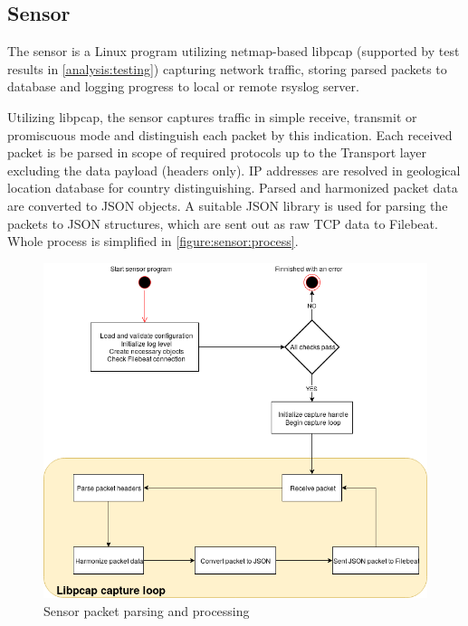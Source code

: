 \documentclass[12pt,a4paper,twoside]{report}
\begin{document}
		\subsection{Sensor} \label{solution:design:sensor}
			The sensor is a Linux program utilizing netmap-based libpcap (supported by test results in \autoref{analysis:testing}) capturing network traffic, storing parsed packets to database and logging progress to local or remote rsyslog server.\par
			Utilizing libpcap, the sensor captures traffic in simple receive, transmit or promiscuous mode and distinguish each packet by this indication. Each received packet is be parsed in scope of required protocols up to the Transport layer excluding the data payload (headers only). IP addresses are resolved in geological location database for country distinguishing. Parsed and harmonized packet data are converted to JSON objects. A suitable JSON library is used for parsing the packets to JSON structures, which are sent out as raw TCP data to Filebeat. Whole process is simplified in \autoref{figure:sensor:process}.
				\begin{figure}[h]
					\centering
					\includegraphics[scale=0.35]{sensor_process}
					\caption{Sensor packet parsing and processing}
					\label{figure:sensor:process}
				\end{figure}
\end{document}
